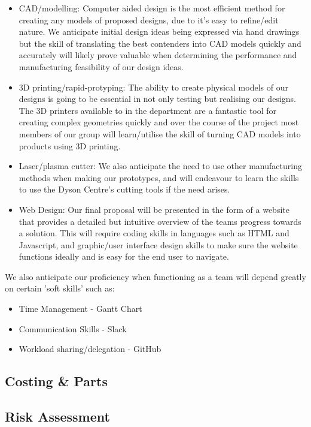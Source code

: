 \documentclass[12pt]{article}
\def\n{\noindent}
\begin{document}
\begin{itemize}
\item CAD/modelling: Computer aided design is the most efficient method for creating any models of proposed designs, due to it's easy to refine/edit nature. We anticipate initial design ideas being expressed via hand drawings but the skill of translating the best contenders into CAD models quickly and accurately will likely prove valuable when determining the performance and manufacturing feasibility of our design ideas. 
\item 3D printing/rapid-protyping: The ability to create physical models of our designs is going to be essential in not only testing but realising our designs. The 3D printers available to in the department are a fantastic tool for creating complex geometries quickly and over the course of the project most members of our group will learn/utilise the skill of turning CAD models into products using 3D printing. 
\item Laser/plasma cutter: We also anticipate the need to use other manufacturing methods when making our prototypes, and will endeavour to learn the skills to use the Dyson Centre's cutting tools if the need arises. 
\item Web Design: Our final proposal will be presented in the form of a website that provides a detailed but intuitive overview of the teams progress towards a solution. This will require coding skills in languages such as HTML and Javascript, and graphic/user interface design skills to make sure the website functions ideally and is easy for the end user to navigate.  
\end{itemize}
 
\n We also anticipate our proficiency when functioning as a team will depend greatly on certain 'soft skills' such as: 

\begin{itemize}
\item Time Management - Gantt Chart 
\item Communication Skills - Slack 
\item Workload sharing/delegation - GitHub 
\end{itemize}

\subsection{Costing \& Parts}

\subsection{Risk Assessment}
\end{document}
